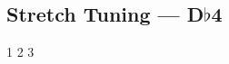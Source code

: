 \subsection{Stretch Tuning --- \UiKey{\I}\UiKey{\SET}D$\flat$4}










































1
2
3
